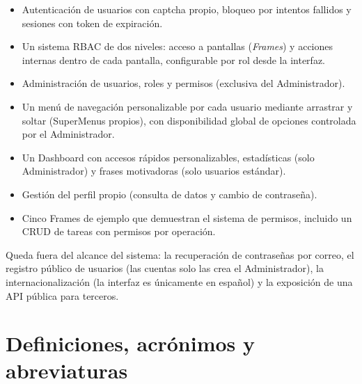 \begin{itemize}
    \item Autenticación de usuarios con captcha propio, bloqueo por intentos
          fallidos y sesiones con token de expiración.
    \item Un sistema RBAC de dos niveles: acceso a pantallas (\textit{Frames})
          y acciones internas dentro de cada pantalla, configurable por rol
          desde la interfaz.
    \item Administración de usuarios, roles y permisos (exclusiva del
          Administrador).
    \item Un menú de navegación personalizable por cada usuario mediante
          arrastrar y soltar (SuperMenus propios), con disponibilidad global
          de opciones controlada por el Administrador.
    \item Un Dashboard con accesos rápidos personalizables, estadísticas
          (solo Administrador) y frases motivadoras (solo usuarios estándar).
    \item Gestión del perfil propio (consulta de datos y cambio de contraseña).
    \item Cinco Frames de ejemplo que demuestran el sistema de permisos,
          incluido un CRUD de tareas con permisos por operación.
\end{itemize}

Queda fuera del alcance del sistema: la recuperación de contraseñas por
correo, el registro público de usuarios (las cuentas solo las crea el
Administrador), la internacionalización (la interfaz es únicamente en
español) y la exposición de una API pública para terceros.

\section{Definiciones, acrónimos y abreviaturas}

